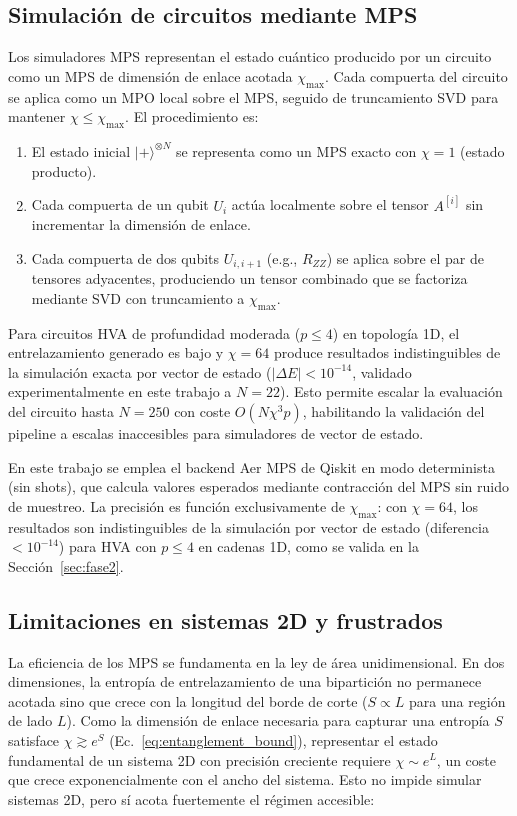 \documentclass[11pt,a4paper,spanish]{book}
\begin{document}
\subsection{Simulación de circuitos mediante MPS}
\label{subsec:mps_sim}

Los simuladores MPS representan el estado cuántico producido por un circuito como un MPS de dimensión de enlace acotada $\chi_{\max}$. Cada compuerta del circuito se aplica como un MPO local sobre el MPS, seguido de truncamiento SVD para mantener $\chi \leq \chi_{\max}$. El procedimiento es:

\begin{enumerate}
    \item El estado inicial $|+\rangle^{\otimes N}$ se representa como un MPS exacto con $\chi = 1$ (estado producto).
    \item Cada compuerta de un qubit $U_i$ actúa localmente sobre el tensor $A^{[i]}$ sin incrementar la dimensión de enlace.
    \item Cada compuerta de dos qubits $U_{i,i+1}$ (e.g., $R_{ZZ}$) se aplica sobre el par de tensores adyacentes, produciendo un tensor combinado que se factoriza mediante SVD con truncamiento a $\chi_{\max}$.
\end{enumerate}

Para circuitos HVA de profundidad moderada ($p \leq 4$) en topología 1D, el entrelazamiento generado es bajo y $\chi = 64$ produce resultados indistinguibles de la simulación exacta por vector de estado ($|\Delta E| < 10^{-14}$, validado experimentalmente en este trabajo a $N = 22$). Esto permite escalar la evaluación del circuito hasta $N = 250$ con coste $O(N \chi^3 p)$, habilitando la validación del pipeline a escalas inaccesibles para simuladores de vector de estado.

En este trabajo se emplea el backend Aer MPS de Qiskit en modo determinista (sin shots), que calcula valores esperados mediante contracción del MPS sin ruido de muestreo. La precisión es función exclusivamente de $\chi_{\max}$: con $\chi = 64$, los resultados son indistinguibles de la simulación por vector de estado (diferencia $< 10^{-14}$) para HVA con $p \leq 4$ en cadenas 1D, como se valida en la Sección~\ref{sec:fase2}.

\subsection{Limitaciones en sistemas 2D y frustrados}

La eficiencia de los MPS se fundamenta en la ley de área unidimensional. En dos dimensiones, la entropía de entrelazamiento de una bipartición no permanece acotada sino que crece con la longitud del borde de corte ($S \propto L$ para una región de lado $L$). Como la dimensión de enlace necesaria para capturar una entropía $S$ satisface $\chi \gtrsim e^{S}$ (Ec.~\ref{eq:entanglement_bound}), representar el estado fundamental de un sistema 2D con precisión creciente requiere $\chi \sim e^{L}$, un coste que crece exponencialmente con el ancho del sistema. Esto no impide simular sistemas 2D, pero sí acota fuertemente el régimen accesible:
\end{document}
